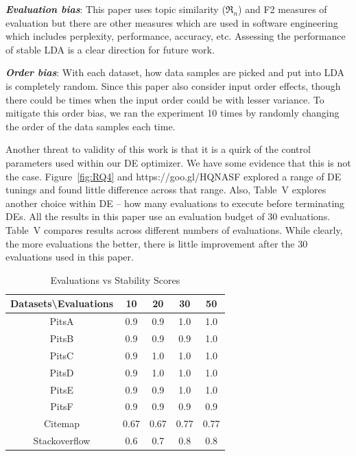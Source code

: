 \documentclass[twocolumn,5p,sort&compress]{elsarticle}
\theoremstyle{break}
\begin{document}
\textbf{\textit{Evaluation bias}}: This paper uses topic similarity ($\Re_n$) and F2 measures of evaluation but there are other measures which are used in software engineering which
includes perplexity, performance, accuracy, etc. Assessing
the performance of stable LDA is a clear direction for future work.

\textbf{\textit{Order bias}}: With each dataset, how data samples are picked and put into LDA is completely random. Since this paper also consider input order effects, though there could be times when the input order could be with lesser variance. To mitigate this order bias, we ran the experiment 10 times by randomly changing the order of the data samples each time.


Another threat to validity of this work is that it is a quirk of the control
parameters used within our DE optimizer.
We have some evidence that this is not the case.
Figure~\ref{fig:RQ4} and https://goo.gl/HQNASF explored a range of DE tunings and found
little difference across that range. Also, Table~V explores another choice within DE -- how
many evaluations to execute before terminating DEs. All the results in this paper use an
evaluation budget of 30 evaluations. Table~V
compares results across different numbers of evaluations. While clearly,
the more evaluations the better, there is little improvement after the
30 evaluations used in this paper.

\begin{table}[!htbp]
\scriptsize
\begin{center}
\begin{tabular}{|c|c|c|c|c|}
\hline 
\textbf{Datasets\textbackslash Evaluations} & \textbf{10} & \textbf{20} & \textbf{30} &
\textbf{50} \\[0.5ex]
\hline
PitsA & 0.9 & 0.9 & 1.0 & 1.0\\ 
\hline
PitsB & 0.9 & 0.9 & 0.9 & 1.0 \\
\hline
PitsC & 0.9 & 1.0 & 1.0 & 1.0\\ 
\hline
PitsD & 0.9 & 1.0 & 1.0 & 1.0\\ 
\hline
PitsE & 0.9 & 0.9 & 1.0 & 1.0\\
\hline
PitsF & 0.9 & 0.9 & 0.9 & 0.9\\
\hline
Citemap & 0.67 & 0.67 & 0.77 & 0.77\\
\hline
Stackoverflow & 0.6 & 0.7 & 0.8 & 0.8\\
\hline
\end{tabular}
\end{center}
\caption{Evaluations vs Stability Scores}
\label{tb:tablename1}
\end{table}
\end{document}
